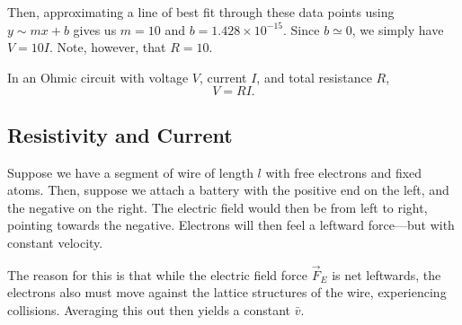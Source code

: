 \documentclass[11pt]{article}
\begin{document}
Then, approximating a line of best fit through these data points using $y \sim mx + b$ gives us $m = 10$ and $b = 1.428 \times 10^{-15}$. Since $b \simeq 0$, we simply have $V = 10I$. Note, however, that $R = 10$.
\begin{law}
    In an Ohmic circuit with voltage $V$, current $I$, and total resistance $R$,
    \begin{equation}
        V = RI.
    \end{equation}
\end{law}

\subsection{Resistivity and Current}
Suppose we have a segment of wire of length $l$ with free electrons and fixed atoms. Then, suppose we attach a battery with the positive end on the left, and the negative on the right. The electric field would then be from left to right, pointing towards the negative. Electrons will then feel a leftward force---but with constant velocity.

The reason for this is that while the electric field force $\vec{F}_E$ is net leftwards, the electrons also must move against the lattice structures of the wire, experiencing collisions. Averaging this out then yields a constant $\bar{v}$.
\end{document}

